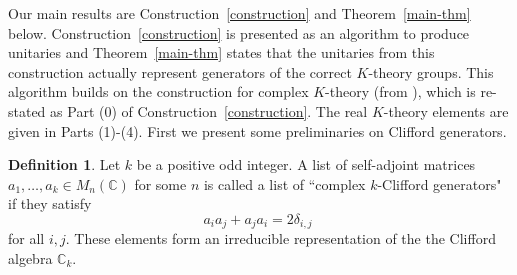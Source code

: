 \documentclass[12pt, reqno]{amsart}
\theoremstyle{definition}
\newtheorem{defn}[thm]{Definition}
\def\C{{\mathbb C}}
\begin{document}
Our main results are Construction~\ref{construction} and Theorem~\ref{main-thm} below. Construction~\ref{construction} is presented as an algorithm to produce unitaries 
and Theorem~\ref{main-thm} states that the unitaries from this construction actually represent generators of the correct $K$-theory groups. This algorithm builds on the construction for complex $K$-theory (from \cite{SBS}), which is re-stated as Part (0) of Construction~\ref{construction}. The real $K$-theory elements are given in Parts (1)-(4). 
First we present some preliminaries on Clifford generators. 

\begin{defn}
Let $k$ be a positive odd integer. A list of self-adjoint matrices $a_1, \dots, a_k \in M_n(\C)$ for some $n$ is called a list of ``complex $k$-Clifford generators" if they satisfy 
$$a_i a_j + a_j a_i = 2 \delta_{i,j} \; $$
for all $i,j$. These elements form an irreducible representation of the the Clifford algebra $\C_k$.
\end{defn}
\end{document}
